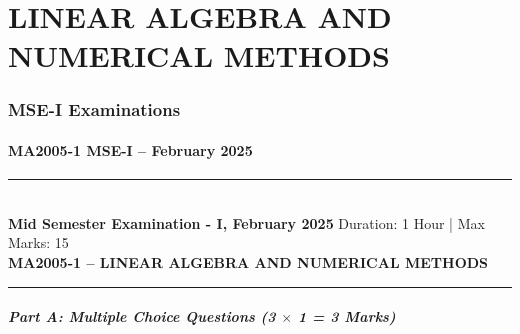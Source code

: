 \documentclass[11pt,a4paper]{article}
\newcommand{\examheader}[4]{
\noindent\rule{\textwidth}{0.5pt}\\
\textbf{#1} \hfill Duration: #3 | Max Marks: #4\\
\textbf{#2}\\
\rule{\textwidth}{0.5pt}
\vspace{0.2cm}
}
\begin{document}
\part{LINEAR ALGEBRA AND NUMERICAL METHODS}

\section{MSE-I Examinations}

\subsection{MA2005-1 MSE-I -- February 2025}
\examheader{Mid Semester Examination - I, February 2025}{MA2005-1 -- LINEAR ALGEBRA AND NUMERICAL METHODS}{1 Hour}{15}

\subsubsection*{Part A: Multiple Choice Questions (3 $\times$ 1 = 3 Marks)}
\end{document}
